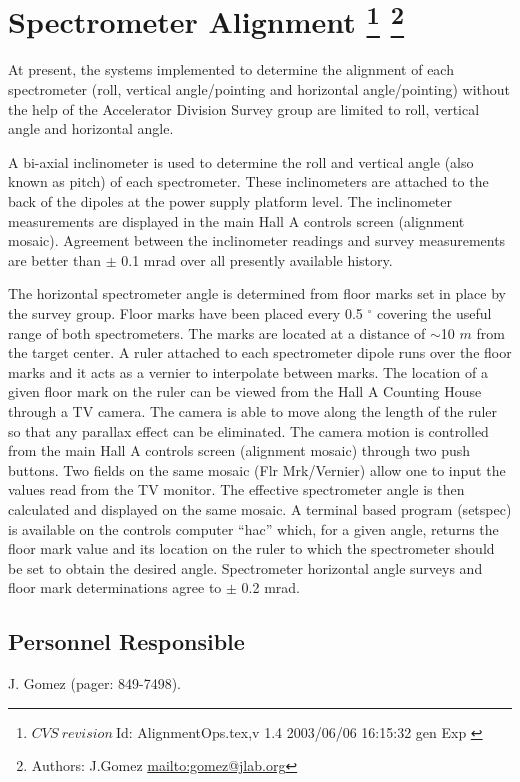 \section[Spectrometer Alignment]{Spectrometer Alignment
\footnote{
  $CVS~revision~ $Id: AlignmentOps.tex,v 1.4 2003/06/06 16:15:32 gen Exp $ $ 
}
\footnote{Authors: J.Gomez \url{mailto:gomez@jlab.org}}
}

At present, the systems implemented to determine the alignment of each spectrometer
(roll, vertical angle/pointing and horizontal angle/pointing) without the help of the
Accelerator Division Survey group are limited to roll, vertical angle and horizontal angle.

A bi-axial inclinometer is used to determine the roll and vertical angle (also known as pitch)
of each spectrometer. These inclinometers are attached to the back of the dipoles at the power
supply platform level. The inclinometer measurements are displayed in the main Hall A controls
screen (alignment mosaic). Agreement between the inclinometer readings and survey measurements
are better than $\pm$ 0.1 mrad over all presently available history.

The horizontal spectrometer angle is determined from floor marks set in
place by the survey group. Floor marks have been placed every 0.5 $^\circ$ covering the useful range of
both spectrometers. The marks are located at a distance of $\sim$10 $m$ from the target center.
A ruler attached to each spectrometer dipole runs over the floor marks and it acts as a vernier to interpolate
between marks. The location of a given floor mark on the ruler can be viewed from the Hall A Counting
House through a TV camera. The camera is able to move along the length of the ruler so that any
parallax effect can be eliminated. The camera motion is controlled from the main Hall A controls screen
(alignment mosaic) through two push buttons. Two fields on the
same mosaic (Flr Mrk/Vernier) allow one to input
the values read from the TV monitor. The effective spectrometer angle is then calculated and displayed
on the same mosaic. A terminal based program (setspec) is available on the controls computer ``hac'' which, for
a given angle, returns the floor mark value and its location on the ruler to which the spectrometer should be set
to obtain the desired angle. Spectrometer horizontal angle surveys and floor mark determinations
agree to $\pm$ 0.2 mrad.

\subsection{Personnel Responsible}
J. Gomez (pager: 849-7498). 

%
%
%
%
